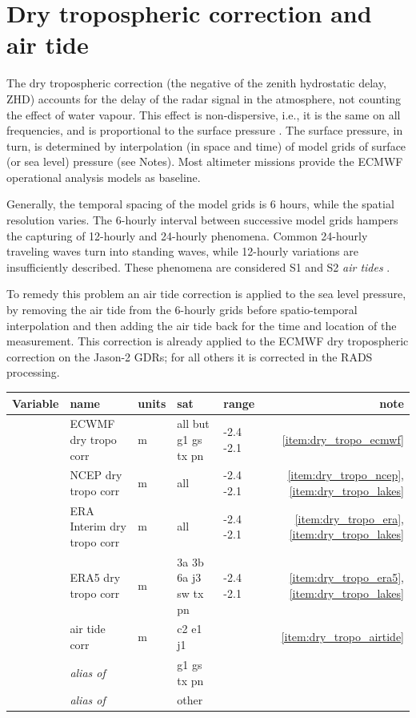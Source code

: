 \documentclass[a4paper,11pt,openany,natbib,nomargin]{thesis}
\newcommand\alias[1]{\emph{alias of} \var{#1}}
\newenvironment{vartable}{
\begin{table}[ht]
\small
\begin{tabular}{lllllr}
\hline\hline
Variable & name & units & sat & range & note \\
\hline\hline
}{
\hline
\end{tabular}
\end{table}
}
\begin{document}
\section{Dry tropospheric correction and air tide}
\label{var:dry_tropo}
The dry tropospheric correction (the negative of the zenith hydrostatic delay, ZHD) accounts for the delay of the radar signal in the atmosphere, not counting the effect of water vapour. This effect is non-dispersive, i.e., it is the same on all frequencies, and is proportional to the surface pressure \citep{saastamoinen1972}. The surface pressure, in turn, is determined by interpolation (in space and time) of model grids of surface (or sea level) pressure (see Notes). Most altimeter missions provide the ECMWF operational analysis models as baseline.

Generally, the temporal spacing of the model grids is 6 hours, while the spatial resolution varies. The 6-hourly interval between successive model grids hampers the capturing of 12-hourly and 24-hourly phenomena. Common 24-hourly traveling waves turn into standing waves, while 12-hourly variations are insufficiently described. These phenomena are considered S1 and S2 \emph{air tides} \citep{ponte2002}.

To remedy this problem an air tide correction is applied to the sea level pressure, by removing the air tide from the 6-hourly grids before spatio-temporal interpolation and then adding the air tide back for the time and location of the measurement. This correction is already applied to the ECMWF dry tropospheric correction on the Jason-2 GDRs; for all others it is corrected in the RADS processing.

\begin{vartable}
\var{dry_tropo_ecmwf} & ECWMF dry tropo corr & m & all but g1 gs tx pn & -2.4 -2.1 & \ref{item:dry_tropo_ecmwf} \\
\var{dry_tropo_ncep}  & NCEP dry tropo corr  & m & all & -2.4 -2.1 & \ref{item:dry_tropo_ncep}, \ref{item:dry_tropo_lakes} \\
\var{dry_tropo_era}   & ERA Interim dry tropo corr & m & all & -2.4 -2.1 & \ref{item:dry_tropo_era}, \ref{item:dry_tropo_lakes} \\
\var{dry_tropo_era5}   & ERA5 dry tropo corr   & m & 3a 3b 6a j3 sw tx pn & -2.4 -2.1 & \ref{item:dry_tropo_era5}, \ref{item:dry_tropo_lakes} \\
\var{dry_tropo_airtide} & air tide corr     & m & c2 e1 j1 & & \ref{item:dry_tropo_airtide} \\
\hline
\var{dry_tropo}       & \alias{dry_tropo_era} && g1 gs tx pn && \\
\var{dry_tropo}       & \alias{dry_tropo_ecmwf} && other && \\
\end{vartable}
\end{document}
